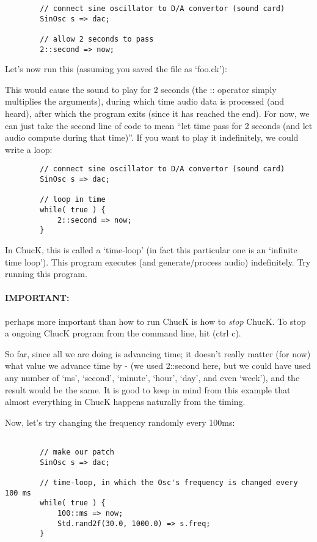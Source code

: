 \begin{verbatim}
        // connect sine oscillator to D/A convertor (sound card)
        SinOsc s => dac;

        // allow 2 seconds to pass
        2::second => now;
\end{verbatim}

Let's now run this (assuming you saved the file as `foo.ck'):


This would cause the sound to play for 2 seconds (the :: operator simply multiplies the arguments), during which time audio data is processed (and heard), after which the program exits (since it has reached the end). For now, we can just take the second line of code to mean ``let time pass for 2 seconds (and let audio compute during that time)''. If you want to play it indefinitely, we could write a loop:

\begin{verbatim}
        // connect sine oscillator to D/A convertor (sound card)
        SinOsc s => dac;

        // loop in time
        while( true ) {
            2::second => now;
        }
\end{verbatim}

In ChucK, this is called a `time-loop' (in fact this particular one is an `infinite time loop'). This program executes (and generate/process audio) indefinitely. Try running this program. 

\paragraph*{IMPORTANT:} perhaps more important than how to run ChucK is how to \textit{stop} ChucK.  To stop a ongoing ChucK program from the command line, hit (ctrl \- c).

So far, since all we are doing is advancing time; it doesn't really matter (for now) what value we advance time by - (we used 2::second here, but we could have used any number of `ms', `second', `minute', `hour', `day', and even `week'), and the result would be the same. It is good to keep in mind from this example that almost everything in ChucK happens naturally from the timing. 

Now, let's try changing the frequency randomly every 100ms:
\begin{verbatim}

        // make our patch
        SinOsc s => dac;

        // time-loop, in which the Osc's frequency is changed every 100 ms
        while( true ) {
            100::ms => now;
            Std.rand2f(30.0, 1000.0) => s.freq;
        }
\end{verbatim}


